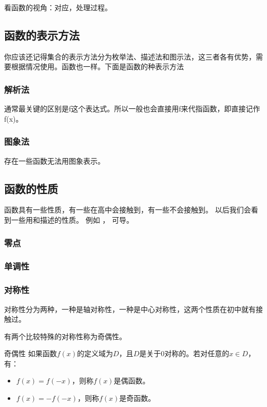 看函数的视角：对应，处理过程。

\subsection{函数的表示方法}

你应该还记得集合的表示方法分为枚举法、描述法和图示法，这三者各有优势，需要根据情况使用。函数也一样。下面是函数的种表示方法

\subsubsection{解析法}

通常最关键的区别是f这个表达式。所以一般也会直接用f来代指函数，即直接记作f(x)。

\subsubsection{图象法}
存在一些函数无法用图象表示。

\subsection{函数的性质}

函数具有一些性质，有一些在高中会接触到，有一些不会接触到。
以后我们会看到一些用和描述的性质。 例如 %
， 可导。
\subsubsection{零点}

\subsubsection{单调性}

\subsubsection{对称性}

对称性分为两种，一种是轴对称性，一种是中心对称性，这两个性质在初中就有接触过。

有两个比较特殊的对称性称为奇偶性。

\begin{definition}{奇偶性}
如果函数$f(x)$的定义域为$D$，且$D$是关于$0$对称的。若对任意的$x\in D$，有：
\begin{itemize}
\item $f(x)=f(-x)$，则称$f(x)$是偶函数。
\item $f(x)=-f(-x)$，则称$f(x)$是奇函数。
\end{itemize}
\end{definition}

